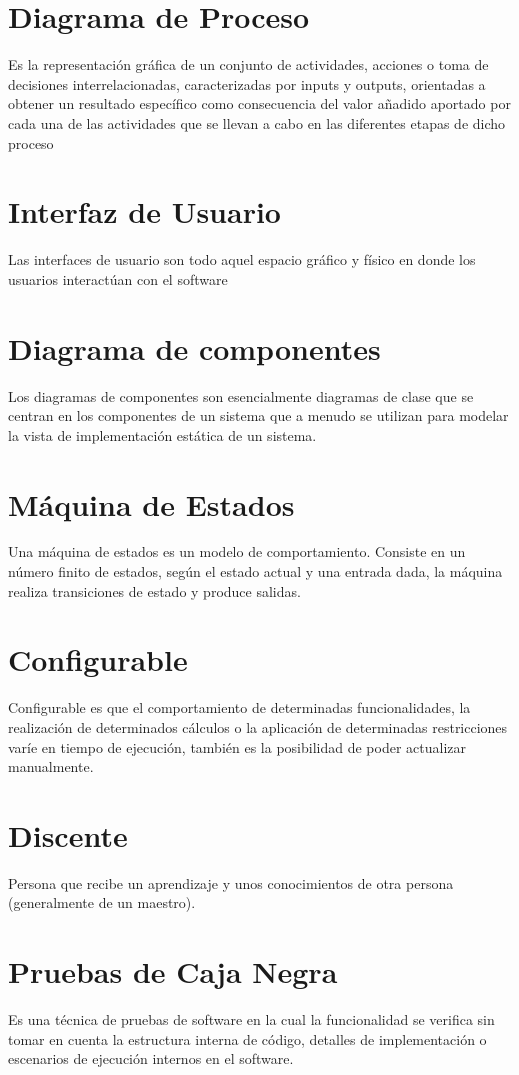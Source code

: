    \section{Diagrama de Proceso}
    Es la representación gráfica de un conjunto de actividades, acciones o toma de decisiones interrelacionadas, caracterizadas por inputs y outputs, orientadas a obtener un resultado específico como consecuencia del valor añadido aportado por cada una de las actividades que se llevan a cabo en las diferentes etapas de dicho proceso
    \section{Interfaz de Usuario}
    Las interfaces de usuario son todo aquel espacio gráfico y físico en donde los usuarios interactúan con el software
    \section{Diagrama de componentes}
    Los diagramas de componentes son esencialmente diagramas de clase que se centran en los componentes de un sistema que a menudo se utilizan para modelar la vista de implementación estática de un sistema.
    \section{Máquina de Estados}
    Una máquina de estados es un modelo de comportamiento. Consiste en un número finito de estados, según el estado actual y una entrada dada, la máquina realiza transiciones de estado y produce salidas.
    \section{Configurable}
    Configurable es que el comportamiento de determinadas funcionalidades, la realización de determinados cálculos o la aplicación de determinadas restricciones varíe en tiempo de ejecución, también es la posibilidad de poder actualizar manualmente. 
    \section{Discente}
     Persona que recibe un aprendizaje y unos conocimientos de otra persona (generalmente de un maestro).
    \section{Pruebas de Caja Negra}
    Es una técnica de pruebas de software en la cual la funcionalidad se verifica sin tomar en cuenta la estructura interna de código, detalles de implementación o escenarios de ejecución internos en el software.
